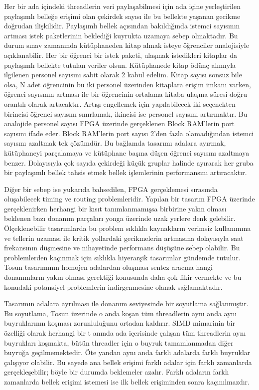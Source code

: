 Her bir ada içindeki threadlerin veri paylaşabilmesi için ada içine yerleştirilen paylaşımlı belleğe erişimi olan çekirdek sayısı ile bu bellekte yaşanan gecikme doğrudan ilişkilidir. Paylaşımlı bellek açısından bakıldığında istemci sayısının artması istek paketlerinin beklediği kuyrukta uzamaya sebep olmaktadır. Bu durum sınav zamanında kütüphaneden kitap almak isteye öğrenciler analojisiyle açıklanabilir. Her bir öğrenci bir istek paketi, ulaşmak istedikleri kitaplar da paylaşımlı bellekte tutulan veriler olsun. Kütüphanede kitap ödünç alımıyla ilgilenen personel sayısını sabit olarak 2 kabul edelim. Kitap sayısı sonsuz bile olsa, N adet öğrencinin bu iki personel üzerinden kitaplara erişim imkanı varken, öğrenci sayısının artması ile bir öğrencinin ortalama kitaba ulaşma süresi doğru orantılı olarak artacaktır. Artışı engellemek için yapılabilecek iki seçenekten birincisi öğrenci sayısını sınırlamak, ikincisi ise personel sayısını artırmaktır. Bu analojide personel sayısı FPGA üzerinde gerçeklenen Block RAM'lerin port sayısını ifade eder. Block RAM'lerin port sayısı 2'den fazla olamadığından istemci sayısını azaltmak tek çözümdür. Bu bağlamda tasarımı adalara ayırmak, kütüphaneyi parçalamaya ve kütüphane başına düşen öğrenci sayısını azaltmaya benzer. Dolayısıyla çok sayıda çekirdeği küçük gruplar halinde ayırarak her gruba bir paylaşımlı bellek tahsis etmek bellek işlemlerinin performansını artıracaktır. \par
Diğer bir sebep ise yukarıda bahsedilen, FPGA gerçeklemesi sırasında oluşabilecek timing ve routing problemleridir. Yapılan bir tasarım FPGA üzerinde gerçeklenirken herhangi bir kısıt tanımlanmamışsa birbirine yakın olması beklenen bazı donanım parçaları yonga üzerinde uzak yerlere denk gelebilir. Ölçeklenebilir tasarımlarda bu problem sıklıkla kaynakların verimsiz kullanımına ve tellerin uzaması ile kritik yollardaki gecikmelerin artmasına dolayısıyla saat frekansının düşmesine ve nihayetinde performans düşüşüne sebep olabilir. Bu problemlerden kaçınmak için sıklıkla hiyerarşik tasarımlar gündemde tutulur. Tosun tasarımının homojen adalardan oluşması sentez aracına hangi donanımların yakın olması gerektiği konusunda daha çok fikir vermekte ve bu konudaki potansiyel problemlerin indirgenmesine olanak sağlamaktadır.\par 
Tasarımın adalara ayrılması ile donanım seviyesinde bir soyutlama sağlanmıştır. Bu soyutlama, Tosun üzerinde o anda koşan tüm threadlerin aynı anda aynı buyruklarının koşması zorunluluğunu ortadan kaldırır. SIMD mimarinin bir özelliği olarak herhangi bir t anında ada içerisinde çalışan tüm threadlerin aynı buyrukları koşmakta, bütün threadler için o buyruk tamamlanmadan diğer buyruğa geçilmemektedir. Öte yandan aynı anda farklı adalarda farklı buyruklar çalışıyor olabilir. Bu sayede ana bellek erişimi farklı adalar için farklı zamanlarda gerçekleşebilir; böyle bir durumda beklemeler azalır. Farklı adaların farklı zamanlarda bellek erişimi istemesi ise ilk bellek erişiminden sonra kaçınılmazdır.  

